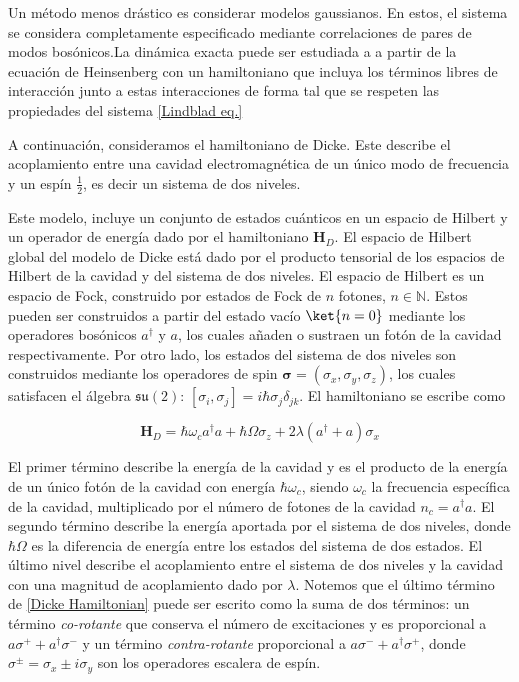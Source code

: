 Un método menos drástico es considerar modelos gaussianos. En estos, el sistema se considera completamente especificado mediante correlaciones de pares de modos bosónicos.La dinámica exacta puede ser estudiada a a partir de la ecuación de Heinsenberg con un hamiltoniano que incluya los términos libres de interacción junto a estas interacciones de forma tal que se respeten las propiedades del sistema \eg \eqref{Lindblad eq.}
 
 

A continuación, consideramos el hamiltoniano de Dicke. Este describe el acoplamiento entre una cavidad electromagnética de un único modo de frecuencia y un espín $\frac{1}{2}$, es decir un sistema de 
dos niveles. 

Este modelo, incluye un conjunto de estados cuánticos en un espacio de Hilbert y un operador de energía dado por el hamiltoniano $\mathbf{H}_D$. El espacio de Hilbert global del modelo de Dicke está dado por el producto tensorial de los espacios de Hilbert de la cavidad y del sistema de dos niveles. El espacio de Hilbert es un espacio de Fock, construido por estados de Fock de $n$ fotones, $n \in \mathds{N}$. Estos  pueden ser construidos a partir del estado vacío $\ket{n=0}$ mediante los operadores bosónicos $a^{\dagger}$ y $a$, los cuales añaden o sustraen un fotón de la cavidad respectivamente. 
Por otro lado, los estados del sistema de dos niveles son construidos mediante los operadores de spin $\boldsymbol{\sigma} = (\sigma_x,\sigma_y,\sigma_z)$, los cuales satisfacen el álgebra $\mathfrak{su(2)}$: $[\sigma_i,\sigma_j]=i\hbar\sigma_j \delta_{jk}$. El hamiltoniano se escribe como

\begin{equation}
    \mathbf{H}_D = \hbar \omega_c a^{\dagger}a + \hbar\Omega \sigma_z + 2\lambda (a^{\dagger} + a)\sigma_x
    \label{Dicke Hamiltonian}
\end{equation}

El primer término describe la energía de la cavidad y es el producto de la energía de un único fotón de la cavidad con energía $\hbar\omega_c$, siendo $\omega_c$ la frecuencia específica de la cavidad, multiplicado por el número de fotones de la cavidad $n_c = a^{\dagger}a$. El segundo término describe la energía aportada por el sistema de dos niveles, donde $\hbar \Omega$ es la diferencia de energía entre los estados del sistema de dos estados. El último nivel describe el acoplamiento entre el sistema de dos niveles y la cavidad con una magnitud de acoplamiento dado por $\lambda$. Notemos que el último término de \eqref{Dicke Hamiltonian} puede ser escrito como la suma de dos términos: un término \textit{co-rotante} que conserva el número de excitaciones y es proporcional a $a\sigma^{+} + a^{\dagger}\sigma^{-}$ y un término \textit{contra-rotante} proporcional a $a\sigma^{-} + a^{\dagger}\sigma^{+}$, donde $\sigma^{\pm}=\sigma_{x}\pm i\sigma_{y}$ son los operadores escalera de espín. 

